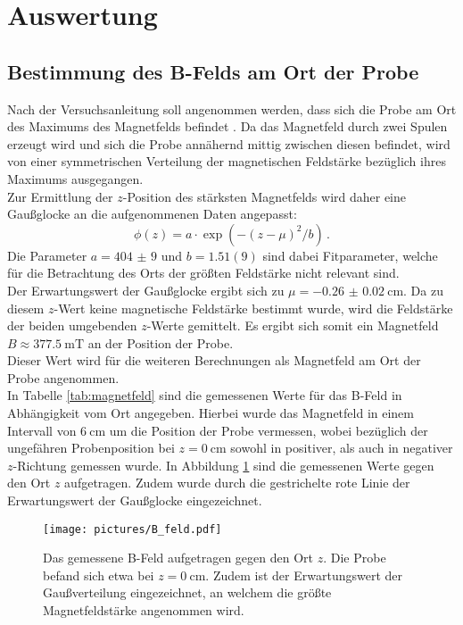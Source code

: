 \section{Auswertung}
\label{sec:Auswertung}
%
\subsection{Bestimmung des B-Felds am Ort der Probe}
Nach der Versuchsanleitung soll angenommen werden, dass sich die Probe am Ort des Maximums des Magnetfelds befindet \cite{Anleitung}.
Da das Magnetfeld durch zwei Spulen erzeugt wird und sich die Probe annähernd mittig zwischen diesen befindet, wird von einer symmetrischen Verteilung der magnetischen Feldstärke bezüglich ihres Maximums ausgegangen.\\ Zur Ermittlung der $z$-Position des stärksten Magnetfelds wird daher eine Gaußglocke an die aufgenommenen Daten angepasst:
\begin{equation}
	\phi(z)=a\cdot\exp\left({-(z-\mu)^2/b}\right) \, \mathrm{.}
\end{equation}
Die Parameter $a=\num{404(9)}$  und $b={1.51(9)}$ sind dabei Fitparameter, welche für die Betrachtung des Orts der größten Feldstärke nicht relevant sind.\\
Der Erwartungswert der Gaußglocke ergibt sich zu $\mu=\SI{-0.26(2)}{\centi\meter}$. Da zu diesem $z$-Wert keine magnetische Feldstärke bestimmt wurde, wird die Feldstärke der beiden umgebenden $z$-Werte gemittelt.
Es ergibt sich somit ein Magnetfeld $B\approx \SI{377.5}{\milli\tesla}$ an der Position der Probe.\\
Dieser Wert wird für die weiteren Berechnungen als Magnetfeld am Ort der Probe angenommen.\\
In Tabelle \ref{tab:magnetfeld} sind die gemessenen Werte für das B-Feld in Abhängigkeit vom Ort angegeben. Hierbei wurde das Magnetfeld in einem Intervall von $\SI{6}{\centi\meter}$ um die Position der Probe vermessen, wobei bezüglich der ungefähren Probenposition bei $z=\SI{0}{\centi\meter}$ sowohl in positiver, als auch in negativer $z$-Richtung gemessen wurde. In Abbildung \ref{fig:magnetfeld} sind die gemessenen Werte gegen den Ort $z$ aufgetragen. Zudem wurde durch die gestrichelte rote Linie der Erwartungswert der Gaußglocke eingezeichnet.
\begin{figure}
  \centering
  \texttt{[image: pictures/B\_feld.pdf]}
  \caption{Das gemessene B-Feld aufgetragen gegen den Ort $z$. Die Probe befand sich etwa bei $z=\SI{0}{\centi\meter}$. Zudem ist der Erwartungswert der Gaußverteilung eingezeichnet, an welchem die größte Magnetfeldstärke angenommen wird.}
  \label{fig:magnetfeld}
\end{figure}
